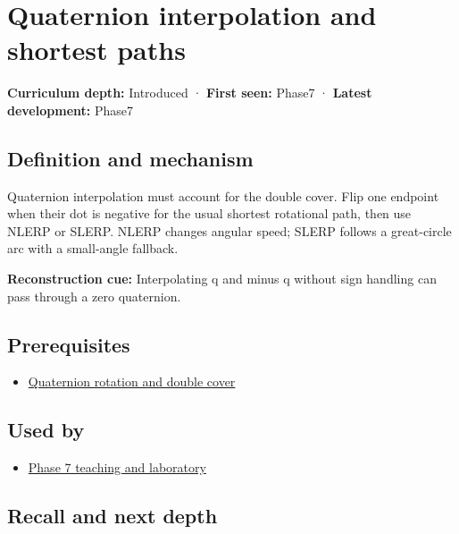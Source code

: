 \hypertarget{appendix-9b4b8254f26b}{}
\section{Quaternion interpolation and shortest paths}\label{appendix-9b4b8254f26b-quaternion-interpolation-and-shortest-paths}

\textbf{Curriculum depth:} Introduced · \textbf{First seen:} Phase7 · \textbf{Latest development:} Phase7

\subsection{Definition and mechanism}\label{appendix-9b4b8254f26b-definition-and-mechanism}

Quaternion interpolation must account for the double cover. Flip one endpoint when their dot is negative for the usual shortest rotational path, then use NLERP or SLERP. NLERP changes angular speed; SLERP follows a great-circle arc with a small-angle fallback.

\textbf{Reconstruction cue:} Interpolating q and minus q without sign handling can pass through a zero quaternion.

\subsection{Prerequisites}\label{appendix-9b4b8254f26b-prerequisites}

\begin{itemize}
\tightlist
\item
  \hyperref[appendix-8e61ab68f6b2]{Quaternion rotation and double cover}
\end{itemize}

\subsection{Used by}\label{appendix-9b4b8254f26b-used-by}

\begin{itemize}
\tightlist
\item
  \hyperref[01-foundations-i-ch018-keep-the-promises-visible-while-moving-between-representations]{Phase 7 teaching and laboratory}
\end{itemize}

\subsection{Recall and next depth}\label{appendix-9b4b8254f26b-recall-and-next-depth}

